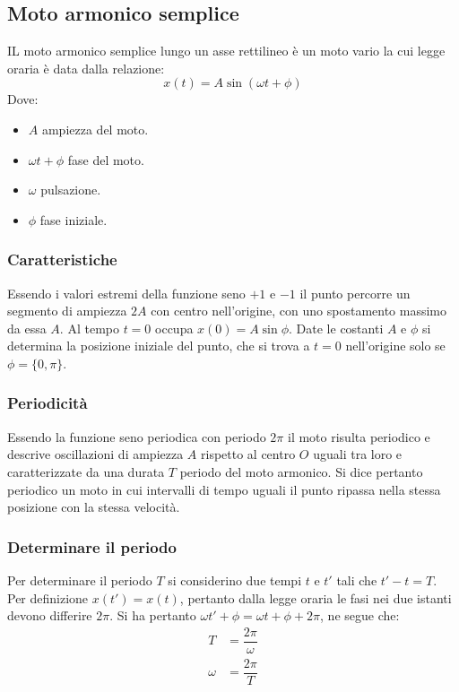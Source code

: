 	\subsection{Moto armonico semplice}
	IL moto armonico semplice lungo un asse rettilineo \`e un moto vario la cui legge oraria \`e data dalla relazione:
	$$x(t) = A \sin(\omega t + \phi)$$
	Dove:
	\begin{multicols}{2}
		\begin{itemize}
			\item $A$ ampiezza del moto.
			\item $\omega t + \phi$ fase del moto.
			\item $\omega$ pulsazione.
			\item $\phi$ fase iniziale.
		\end{itemize}
	\end{multicols}

		\subsubsection{Caratteristiche}
		Essendo i valori estremi della funzione seno $+1$ e $-1$ il punto percorre un segmento di ampiezza $2A$ con centro nell'origine, con uno spostamento massimo da essa $A$.
		Al tempo $t=0$ occupa $x(0)=A\sin\phi$.
		Date le costanti $A$ e $\phi$ si determina la posizione iniziale del punto, che si trova a $t=0$ nell'origine solo se $\phi=\{0, \pi\}$.

		\subsubsection{Periodicit\`a}
		Essendo la funzione seno periodica con periodo $2\pi$ il moto risulta periodico e descrive oscillazioni di ampiezza $A$ rispetto al centro $O$ uguali tra loro e caratterizzate da una durata $T$ periodo del moto armonico.
		Si dice pertanto periodico un moto in cui intervalli di tempo uguali il punto ripassa nella stessa posizione con la stessa velocit\`a.

		\subsubsection{Determinare il periodo}
		Per determinare il periodo $T$ si considerino due tempi $t$ e $t'$ tali che $t'-t = T$.
		Per definizione $x(t')=x(t)$, pertanto dalla legge oraria le fasi nei due istanti devono differire $2\pi$.
		Si ha pertanto $\omega t' +\phi = \omega t + \phi + 2\pi$, ne segue che:
		\begin{align*}
			T &= \dfrac{2\pi}{\omega}\\
			\omega &=\dfrac{2\pi}{T}
		\end{align*}

